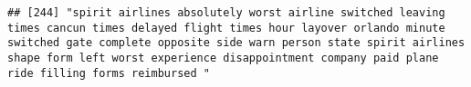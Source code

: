 \documentclass[
]{article}
\begin{document}
\begin{verbatim}
## [244] "spirit airlines absolutely worst airline switched leaving times cancun times delayed flight times hour layover orlando minute switched gate complete opposite side warn person state spirit airlines shape form left worst experience disappointment company paid plane ride filling forms reimbursed "                                                                                                                                                                                                                                                                                                                                                                                                                                                                                                                                                                                                                                                                                                                                                                                                                                                                                                                                                                                                                                                                                                                                                                                                                                                                                                                                                                                                                                                                                        

\end{verbatim}
\end{document}

